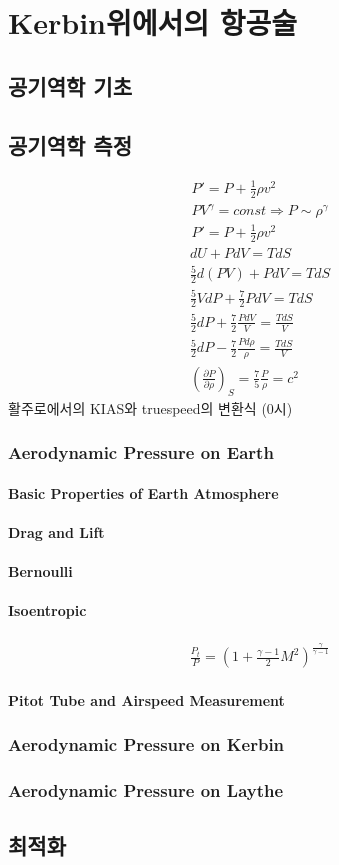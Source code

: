 \part{Kerbin위에서의 항공술}
\chapter{공기역학 기초}
\chapter{공기역학 측정}
\begin{align}
P'= P + \frac{1}{2} \rho v^2
\\
PV^\gamma=const \Rightarrow P \sim \rho^\gamma
\\
P'= P + \frac{1}{2} \rho v^2
\end{align}
\begin{align}
	dU +PdV = TdS
	\\ \frac{5}{2}d(PV) + PdV = TdS
	\\ \frac{5}{2} VdP + \frac{7}{2} PdV = TdS 
	\\ \frac{5}{2} dP + \frac{7}{2} \frac{PdV}{V} =\frac{TdS}{V} 
	\\ \frac{5}{2} dP -\frac{7}{2} \frac{Pd\rho}{\rho} =\frac{TdS}{V} 
	\\ \left(\frac{\partial P}{\partial\rho}\right)_S = \frac{7}{5}\frac{P}{\rho} = c^2
\end{align}
활주로에서의 KIAS와 truespeed의 변환식 (0시)

\section{Aerodynamic Pressure on Earth}
\subsection{Basic Properties of Earth Atmosphere}
\subsection{Drag and Lift}
\subsection{Bernoulli}
\subsection{Isoentropic}
	\begin{align}
		\frac{P_t}{P} = \left( 1+\frac{\gamma-1}{2}M^2 \right)^{\frac{\gamma}{\gamma -1}}
	\end{align}
\subsection{Pitot Tube and Airspeed Measurement}
\section{Aerodynamic Pressure on Kerbin}
\section{Aerodynamic Pressure on Laythe}
\chapter{최적화}